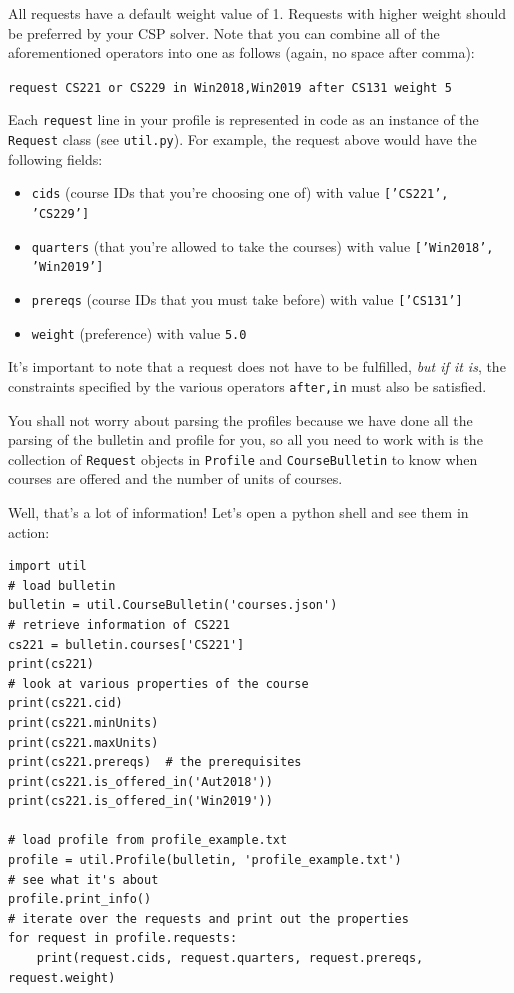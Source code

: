 \documentclass{article}
\theoremstyle{case}
\theoremstyle{definition}
\begin{document}
\begin{itemize}
All requests have a default weight value of 1. Requests with higher weight should be preferred by your CSP solver. Note that you can combine all of the aforementioned operators into one as follows (again, no space after comma): 

\texttt{request CS221 or CS229 in Win2018,Win2019 after CS131 weight 5}
\end{itemize}
Each \texttt{request} line in your profile is represented in code as an instance of the \texttt{Request} class (see \texttt{util.py}). For example, the request above would have the following fields:
\begin{itemize}
\item \texttt{cids} (course IDs that you're choosing one of) with value \texttt{['CS221', 'CS229']}
\item \texttt{quarters} (that you're allowed to take the courses) with value \texttt{['Win2018', 'Win2019']}
\item \texttt{prereqs} (course IDs that you must take before) with value \texttt{['CS131']}
\item \texttt{weight} (preference) with value \texttt{5.0}
\end{itemize}
It's important to note that a request does not have to be fulfilled, \textit{but if it is}, the constraints specified by the various operators \texttt{after,in} must also be satisfied. 

You shall not worry about parsing the profiles because we have done all the parsing of the bulletin and profile for you, so all you need to work with is the collection of \texttt{Request} objects in \texttt{Profile} and \texttt{CourseBulletin} to know when courses are offered and the number of units of courses. 

Well, that's a lot of information! Let's open a python shell and see them in action:

\begin{verbatim}
import util
# load bulletin
bulletin = util.CourseBulletin('courses.json')
# retrieve information of CS221
cs221 = bulletin.courses['CS221']
print(cs221)
# look at various properties of the course
print(cs221.cid)
print(cs221.minUnits)
print(cs221.maxUnits)
print(cs221.prereqs)  # the prerequisites
print(cs221.is_offered_in('Aut2018'))
print(cs221.is_offered_in('Win2019'))

# load profile from profile_example.txt
profile = util.Profile(bulletin, 'profile_example.txt')
# see what it's about
profile.print_info()
# iterate over the requests and print out the properties
for request in profile.requests:
    print(request.cids, request.quarters, request.prereqs, request.weight)
\end{verbatim}
\end{document}
